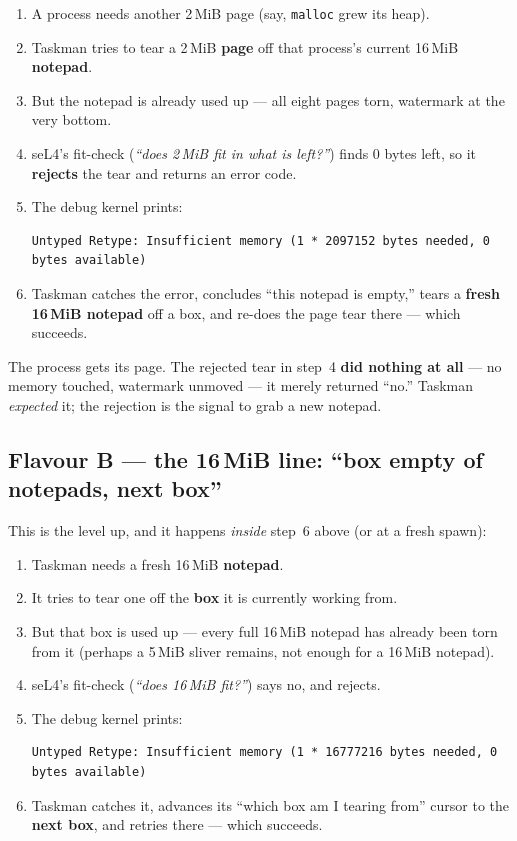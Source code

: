 \begin{enumerate}
    \item A process needs another 2\,MiB page (say, \texttt{malloc}
          grew its heap).
    \item Taskman tries to tear a 2\,MiB \textbf{page} off that
          process's current 16\,MiB \textbf{notepad}.
    \item But the notepad is already used up --- all eight pages torn,
          watermark at the very bottom.
    \item seL4's fit-check (\emph{``does 2\,MiB fit in what is left?''})
          finds 0 bytes left, so it \textbf{rejects} the tear and
          returns an error code.
    \item The debug kernel prints:
\begin{lstlisting}
Untyped Retype: Insufficient memory (1 * 2097152 bytes needed, 0 bytes available)
\end{lstlisting}
    \item Taskman catches the error, concludes ``this notepad is
          empty,'' tears a \textbf{fresh 16\,MiB notepad} off a box,
          and re-does the page tear there --- which succeeds.
\end{enumerate}

The process gets its page. The rejected tear in step~4 \textbf{did
nothing at all} --- no memory touched, watermark unmoved --- it merely
returned ``no.'' Taskman \emph{expected} it; the rejection is the
signal to grab a new notepad.

\subsection{Flavour B --- the 16\,MiB line: ``box empty of notepads, next box''}

This is the level up, and it happens \emph{inside} step~6 above (or at
a fresh spawn):

\begin{enumerate}
    \item Taskman needs a fresh 16\,MiB \textbf{notepad}.
    \item It tries to tear one off the \textbf{box} it is currently
          working from.
    \item But that box is used up --- every full 16\,MiB notepad has
          already been torn from it (perhaps a 5\,MiB sliver remains,
          not enough for a 16\,MiB notepad).
    \item seL4's fit-check (\emph{``does 16\,MiB fit?''}) says no, and
          rejects.
    \item The debug kernel prints:
\begin{lstlisting}
Untyped Retype: Insufficient memory (1 * 16777216 bytes needed, 0 bytes available)
\end{lstlisting}
    \item Taskman catches it, advances its ``which box am I tearing
          from'' cursor to the \textbf{next box}, and retries there ---
          which succeeds.
\end{enumerate}

